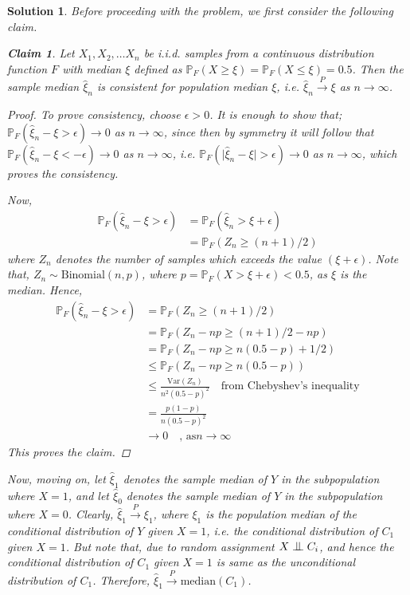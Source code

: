 \documentclass[12pt]{article}
\newtheorem*{claim}{Claim}  %
\theoremstyle{problemstyle}
\newtheorem*{solution*}{Solution}
\def\Pr{\mathbb{P}}
\newcommand{\indep}{\mathrel{\text{\scalebox{1.07}{$\perp\mkern-10mu\perp$}}}}
\begin{document}
\begin{solution*}

Before proceeding with the problem, we first consider the following claim.

\begin{claim}
	Let $X_1, X_2, \dots X_n$ be i.i.d. samples from a continuous distribution function $F$ with median $\xi$ defined as $\Pr_F(X \geq \xi) = \Pr_F(X \leq \xi) = 0.5$. Then the sample median $\hat{\xi}_n$ is consistent for population median $\xi$, i.e. $\hat{\xi}_n\xrightarrow{P} \xi$ as $n\rightarrow \infty$.
\end{claim}
\begin{proof}
	To prove consistency, choose $\epsilon > 0$. It is enough to show that;
	$\Pr_F(\hat{\xi}_n - \xi > \epsilon ) \rightarrow 0$ as $n \rightarrow \infty$, since then by symmetry it will follow that $\Pr_F(\hat{\xi}_n - \xi < -\epsilon ) \rightarrow 0$ as $n \rightarrow \infty$, i.e. $\Pr_F(\vert \hat{\xi}_n - \xi \vert > \epsilon ) \rightarrow 0$ as $n \rightarrow \infty$, which proves the consistency.
	
	Now,
	\begin{align*}
		\Pr_F(\hat{\xi}_n - \xi > \epsilon ) & = \Pr_F(\hat{\xi}_n > \xi + \epsilon)\\
		& = \Pr_F\left(Z_n \geq (n+1)/2 \right)
	\end{align*}
	where $Z_n$ denotes the number of samples which exceeds the value $(\xi + \epsilon)$. Note that, $Z_n \sim \text{Binomial}(n, p)$, where $p = \Pr_F(X > \xi + \epsilon) < 0.5$, as $\xi$ is the median. Hence,
	\begin{align*}
		\Pr_F(\hat{\xi}_n - \xi > \epsilon ) & = \Pr_F\left(Z_n \geq (n+1)/2 \right)\\
		& = \Pr_F\left(Z_n - np \geq (n+1)/2 - np\right)\\
		& = \Pr_F\left(Z_n - np \geq n(0.5 - p) + 1/2\right)\\
		& \leq \Pr_F\left(Z_n - np \geq n(0.5 - p) \right)\\
		& \leq \frac{\text{Var}(Z_n)}{n^2(0.5 - p)^2} \quad \text{from Chebyshev's inequality}\\
		& = \frac{p(1-p)}{n(0.5 - p)^2}\\
		& \rightarrow 0 \quad \text{, as} n \rightarrow \infty 
	\end{align*}
	This proves the claim.
\end{proof}

Now, moving on, let $\hat{\xi}_1$ denotes the sample median of $Y$ in the subpopulation where $X = 1$, and let  $\hat{\xi}_0$ denotes the sample median of $Y$ in the subpopulation where $X = 0$. Clearly, $\hat{\xi}_1 \xrightarrow{P} \xi_1$, where $\xi_1$ is the population median of the conditional distribution of $Y$ given $X = 1$, i.e. the conditional distribution of $C_1$ given $X = 1$. But note that, due to random assignment $X \indep C_i$, and hence the conditional distribution of $C_1$ given $X = 1$ is same as the unconditional distribution of $C_1$. Therefore, $\hat{\xi}_1 \xrightarrow{P} \mathrm{median}(C_1)$. 


\end{solution*}
\end{document}
